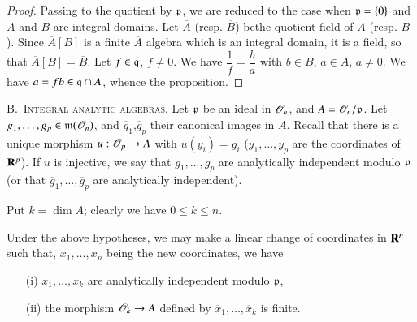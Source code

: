 \begin{proof}
Passing to the quotient by $\mathfrak{p}$, we are reduced to the case when $\mathfrak{p}=\{0\}$ and $A$ and $B$ are integral domains. Let $\overline{A}$ (resp. $\overline{B}$) be\pageoriginale the quotient field of $A$ (resp. $B$). Since $\overline{A}[B]$ is a finite $\overline{A}$ algebra which is an integral domain, it is a field, so that $\overline{A}[B]=\overline{B}$. Let $f\in \mathfrak{q}$, $f\neq 0$. We have $\dfrac{1}{f}=\dfrac{b}{a}$ with $b\in B$, $a\in A$, $a\neq 0$. We have $a=fb\in \mathfrak{q}\cap A$, whence the proposition.
\end{proof}

B.~\textsc{Integral analytic algebras.} Let $\mathfrak{p}$ be an ideal in $\mathscr{O}_{n}$, and $A=\mathscr{O}_{n}/\mathfrak{p}$. Let $g_{1},\ldots,g_{p}\in \mathfrak{m}(\mathscr{O}_{n})$, and $\overline{g}_{1}$,\quad $\overline{g}_{p}$ their canonical images in $A$. Recall that there is a unique morphism $u:\mathscr{O}_{p}\to A$ with $u(y_{i})=\overline{g}_{i}$ ($y_{1},\ldots,y_{p}$ are the coordinates of $\mathbf{R}^{p}$). If $u$ is injective, we say that $g_{1},\ldots,g_{p}$ are analytically independent modulo $\mathfrak{p}$ (or that $\overline{g}_{1},\ldots,\overline{g}_{p}$ are analytically independent).

Put $k=\dim A$; clearly we have $0\leq k\leq n$.

\begin{theorem}\label{chap3-thm5.5}
Under the above hypotheses, we may make a linear change of coordinates in $\mathbf{R}^{n}$ such that, $x_{1},\ldots,x_{n}$ being the new coordinates, we have
\begin{itemize}
\item[\rm(i)] $x_{1},\ldots,x_{k}$ are analytically independent modulo $\mathfrak{p}$,

\item[\rm(ii)] the morphism $\mathscr{O}_{k}\to A$ defined by $\overline{x}_{1},\ldots,\overline{x}_{k}$ is finite.
\end{itemize}
\end{theorem}

